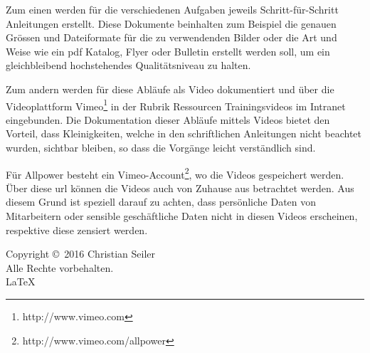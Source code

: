 \documentclass[a4paper,11pt,twoside,titlepage,openright]{report}
\numberwithin{equation}{section}		%
\numberwithin{figure}{section}			%
\numberwithin{table}{section}				%
\begin{document}
Zum einen werden für die verschiedenen Aufgaben jeweils Schritt-für-Schritt Anleitungen erstellt. Diese Dokumente beinhalten zum Beispiel die genauen Grössen und Dateiformate für die zu verwendenden Bilder oder die Art und Weise wie ein \acrshort{pdf} Katalog, Flyer oder Bulletin erstellt werden soll, um ein gleichbleibend hochstehendes Qualitätsniveau zu halten.

Zum andern werden für diese Abläufe als Video dokumentiert und über die Videoplattform Vimeo\footnote{http://www.vimeo.com} in der Rubrik Ressourcen  Trainingsvideos im Intranet eingebunden. Die Dokumentation dieser Abläufe mittels Videos bietet den Vorteil, dass Kleinigkeiten, welche in den schriftlichen Anleitungen nicht beachtet wurden, sichtbar bleiben, so dass die Vorgänge leicht verständlich sind.

Für Allpower besteht ein Vimeo-Account\footnote{http://www.vimeo.com/allpower}, wo die Videos gespeichert werden. Über diese \acrshort{url} können die Videos auch von Zuhause aus betrachtet werden. Aus diesem Grund ist speziell darauf zu achten, dass persönliche Daten von Mitarbeitern oder sensible geschäftliche Daten nicht in diesen Videos erscheinen, respektive diese zensiert werden.

\printglossaries
\cleardoublepage
\pagestyle{empty}
\vspace*{\fill}
\begin{center}
Copyright \copyright \ 2016 Christian Seiler \\
Alle Rechte vorbehalten.\\
\LaTeX
\end{center}
\end{document}
